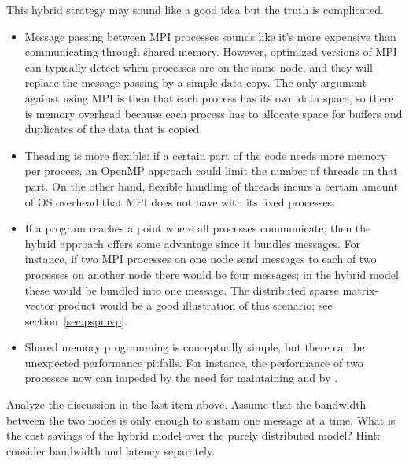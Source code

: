 This hybrid strategy may sound like a good idea but the truth is complicated.
\begin{itemize}
\item Message passing between MPI processes sounds like it's more
  expensive than communicating through shared memory. However,
  optimized versions of MPI can typically detect when processes are on
  the same node, and they will replace the message passing by a simple
  data copy. The only argument against using MPI is then that each
  process has its own data space, so there is memory overhead because
  each process has to allocate space for buffers and duplicates of the
  data that is copied.
\item Theading is more flexible: if a certain part of the code needs
  more memory per process, an OpenMP approach could limit the number
  of threads on that part. On the other hand, flexible handling of
  threads incurs a certain amount of \ac{OS} overhead that MPI does
  not have with its fixed processes.
\item If a program reaches a point where all processes communicate,
  then the hybrid approach offers some advantage since it bundles
  messages. For instance, if two MPI processes on one node send
  messages to each of two processes on another node there would be
  four messages; in the hybrid model these would be bundled into one
  message. The distributed sparse
  matrix-vector product would be a good illustration of this scenario;
  see section~\ref{sec:pspmvp}.
\item Shared memory programming is conceptually simple, but there can
  be unexpected performance pitfalls. For instance, the performance of
  two processes now
  can impeded by the need for maintaining
   and by .
\end{itemize}

\begin{exercise}
  Analyze the discussion in the last item above. Assume that the
  bandwidth between the two nodes is only enough to sustain one
  message at a time. What is the cost savings of the hybrid model over
  the purely distributed model? Hint: consider bandwidth and latency
  separately.
\end{exercise}

